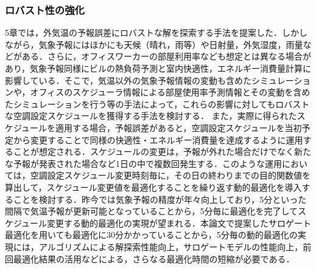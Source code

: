 \subsubsection{ロバスト性の強化}
5章では，外気温の予報誤差にロバストな解を探索する手法を提案した．しかしながら，気象予報にはほかにも天候（晴れ，雨等）や日射量，外気湿度，雨量などがある．さらに，オフィスワーカーの部屋利用率なども想定とは異なる場合があり，気象予報同様にビルの熱負荷予測と室内快適性，エネルギー消費量計算に影響している．そこで，気温以外の気象予報情報の変動も含めたシミュレーションや，オフィスのスケジューラ情報による部屋使用率予測情報とその変動を含めたシミュレーションを行う等の手法によって，これらの影響に対してもロバストな空調設定スケジュールを獲得する手法を検討する．
また，実際に得られたスケジュールを適用する場合，予報誤差があると，空調設定スケジュールを当初予定から変更することで同様の快適性・エネルギー消費量を達成するように運用することが想定される．スケジュールの変更は，予報が外れた場合だけでなく新たな予報が発表された場合など1日の中で複数回発生する．このような運用においては，空調設定スケジュール変更時刻毎に，その日の終わりまでの目的関数値を算出して，スケジュール変更値を最適化することを繰り返す動的最適化を導入することを検討する．昨今では気象予報の精度が年々向上しており，5分といった間隔で気温予報が更新可能となっていることから\cite{Weather17}，5分毎に最適化を完了してスケジュール変更する動的最適化の実現が望まれる．本論文で提案したサロゲート最適化を用いても最適化に30分かかっていることから，5分毎の動的最適化の実現には，アルゴリズムによる解探索性能向上，サロゲートモデルの性能向上，前回最適化結果の活用などによる，さらなる最適化時間の短縮が必要である．


